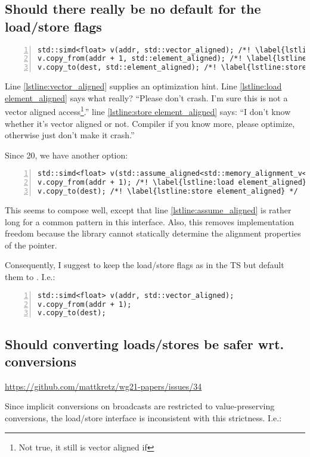 \subsection{Should there really be no default for the load/store flags}
\begin{lstlisting}[numbers=left]
std::simd<float> v(addr, std::vector_aligned); /*! \label{lstline:vector_aligned} */
v.copy_from(addr + 1, std::element_aligned); /*! \label{lstline:load element_aligned} */
v.copy_to(dest, std::element_aligned); /*! \label{lstline:store element_aligned} */
\end{lstlisting}
Line \ref{lstline:vector_aligned} supplies an optimization hint.
Line \ref{lstline:load element_aligned} says what really?
“Please don't crash.
I'm sure this is not a vector aligned access\footnote{Not true, it still is vector aligned if }.”
line \ref{lstline:store element_aligned} says:
“I don't know whether it's vector aligned or not.
Compiler if you know more, please optimize, otherwise just don't make it crash.”

Since \CC{}20, we have another option:
\begin{lstlisting}[numbers=left]
std::simd<float> v(std::assume_aligned<std::memory_alignment_v<std::simd<float>>>(addr)); /*! \label{lstline:assume_aligned} */
v.copy_from(addr + 1); /*! \label{lstline:load element_aligned} */
v.copy_to(dest); /*! \label{lstline:store element_aligned} */
\end{lstlisting}
This seems to compose well, except that line \ref{lstline:assume_aligned} is rather long for a common pattern in this interface.
Also, this removes implementation freedom because the library cannot statically determine the alignment properties of the pointer.

Consequently, I suggest to keep the load/store flags as in the TS but default them to .
I.e.:
\begin{lstlisting}[numbers=left]
std::simd<float> v(addr, std::vector_aligned);
v.copy_from(addr + 1);
v.copy_to(dest);
\end{lstlisting}

\subsection{Should converting loads/stores be safer wrt. conversions}
\url{https://github.com/mattkretz/wg21-papers/issues/34}

Since implicit conversions on broadcasts are restricted to value-preserving conversions, the load/store interface is inconsistent with this strictness.
I.e.:

